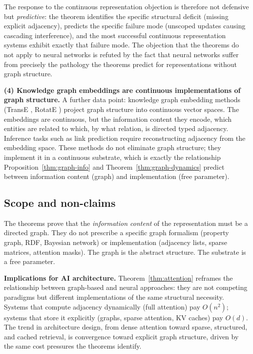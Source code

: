 \documentclass[11pt]{article}
\theoremstyle{definition}
\begin{document}
The response to the continuous representation objection is therefore
not defensive but \emph{predictive}: the theorem identifies the specific
structural deficit (missing explicit adjacency), predicts the specific
failure mode (unscoped updates causing cascading interference), and the
most successful continuous representation systems exhibit exactly that
failure mode. The objection that the theorems do not apply to neural
networks is refuted by the fact that neural networks suffer from
precisely the pathology the theorems predict for representations
without graph structure.

\textbf{(4) Knowledge graph embeddings are continuous implementations
of graph structure.}
A further data point: knowledge graph embedding methods (TransE
\cite{Bordes2013}, RotatE \cite{Sun2019}) project graph structure into
continuous vector spaces. The embeddings are continuous, but the
information content they encode, which entities are related to which,
by what relation, is directed typed adjacency. Inference tasks such
as link prediction require reconstructing adjacency from the embedding
space. These methods do not eliminate graph structure; they implement it
in a continuous substrate, which is exactly the relationship
Proposition~\ref{thm:graph-info} and Theorem~\ref{thm:graph-dynamics} predict between
information content (graph) and implementation (free parameter).

\subsection{Scope and non-claims}

The theorems prove that the \emph{information content} of the
representation must be a directed graph. They do not prescribe a
specific graph formalism (property graph, RDF, Bayesian network) or
implementation (adjacency lists, sparse matrices, attention masks). The
graph is the abstract structure. The substrate is a free parameter.

\textbf{Implications for AI architecture.}
Theorem~\ref{thm:attention} reframes the relationship between
graph-based and neural approaches: they are not competing paradigms but
different implementations of the same structural necessity. Systems that
compute adjacency dynamically (full attention) pay $O(n^2)$; systems
that store it explicitly (graphs, sparse attention, KV caches) pay
$O(d)$. The trend in architecture design, from dense attention toward
sparse, structured, and cached retrieval, is convergence toward
explicit graph structure, driven by the same cost pressures the theorems
identify.
\end{document}
